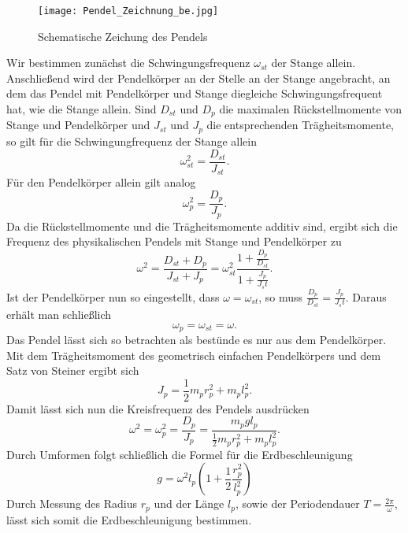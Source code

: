 \documentclass[a4paper, 12pt]{scrartcl}
\begin{document}
\begin{figure}[h]
	\centering
	\texttt{[image: Pendel\_Zeichnung\_be.jpg]}
	\caption{Schematische Zeichung des Pendels}
\end{figure}

Wir bestimmen zunächst die Schwingungsfrequenz $\omega_{st}$ der Stange allein. Anschließend wird der Pendelkörper an der Stelle an der Stange angebracht, an dem das Pendel mit Pendelkörper und Stange diegleiche Schwingungsfrequent hat, wie die Stange allein. Sind $D_{st}$ und $D_p$ die maximalen Rückstellmomente von Stange und Pendelkörper und $J_{st}$ und $J_p$ die entsprechenden Trägheitsmomente, so gilt für die Schwingungfrequenz der Stange allein
$$\omega_{st}^2 = \frac{D_{st}}{J_{st}}.$$
Für den Pendelkörper allein gilt analog
$$\omega_p^2 = \frac{D_p}{J_p}.$$
Da die Rückstellmomente und die Trägheitsmomente additiv sind, ergibt sich die Frequenz des physikalischen Pendels mit Stange und Pendelkörper zu
$$\omega^2 = \frac{D_{st} + D_p}{J_{st} + J_p} = \omega_{st}^2 \frac{1+\frac{D_p}{D_{st}}}{1+\frac{J_p}{J_st}}.$$
Ist der Pendelkörper nun so eingestellt, dass $\omega = \omega_{st}$, so muss $\frac{D_p}{D_{st}} = \frac{J_p}{J_st}$. Daraus erhält man schließlich
$$\omega_p = \omega_{st} = \omega.$$
Das Pendel lässt sich so betrachten als bestünde es nur aus dem Pendelkörper. Mit dem Trägheitsmoment des geometrisch einfachen Pendelkörpers und dem Satz von Steiner ergibt sich
$$J_p = \frac 12 m_p r_p^2 + m_pl_p^2.$$
Damit lässt sich nun die Kreisfrequenz des Pendels ausdrücken
$$\omega^2 = \omega_p^2 = \frac{D_p}{J_p} = \frac{m_pgl_p}{\frac 12 m_pr_p^2+m_pl_p^2}.$$
Durch Umformen folgt schließlich die Formel für die Erdbeschleunigung
$$g = \omega^2l_p \left( 1 + \frac 12 \frac{r_p^2}{l_p^2} \right)$$
Durch Messung des Radius $r_p$ und der Länge $l_p$, sowie der Periodendauer $T = \frac{2\pi}{\omega}$, lässt sich somit die Erdbeschleunigung bestimmen.
\end{document}
